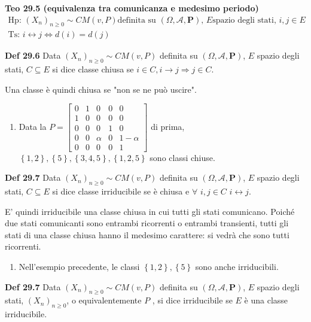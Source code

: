 \documentclass{article}
\begin{document}
\textbf{Teo 29.5 (equivalenza tra comunicanza e medesimo periodo)}%
\begin{gather*}
\text{Hp: }\left( X_{n}\right) _{n\geq 0}\sim CM\left( v,P\right) \text{
definita su }\left( \Omega ,\mathcal{A},\mathbf{P}\right) \text{, }E\text{
spazio degli stati, }i,j\in E \\
\text{Ts: }i\leftrightarrow j\Longleftrightarrow d\left( i\right) =d\left(
j\right)
\end{gather*}

\textbf{Def 29.6} Data $\left( X_{n}\right) _{n\geq 0}\sim CM\left(
v,P\right) $ definita su $\left( \Omega ,\mathcal{A},\mathbf{P}\right) $, $E$
spazio degli stati, $C\subseteq E$ si dice classe chiusa se $i\in
C,i\rightarrow j\Longrightarrow j\in C$.

Una classe \`{e} quindi chiusa se "non se ne pu\`{o} uscire".

\begin{enumerate}
\item Data la $P=\left[ 
\begin{array}{ccccc}
0 & 1 & 0 & 0 & 0 \\ 
1 & 0 & 0 & 0 & 0 \\ 
0 & 0 & 0 & 1 & 0 \\ 
0 & 0 & \alpha & 0 & 1-\alpha \\ 
0 & 0 & 0 & 0 & 1%
\end{array}%
\right] $ di prima, $\left\{ 1,2\right\} ,\left\{ 5\right\} ,\left\{
3,4,5\right\} ,\left\{ 1,2,5\right\} $ sono classi chiuse.
\end{enumerate}

\textbf{Def 29.7} Data $\left( X_{n}\right) _{n\geq 0}\sim CM\left(
v,P\right) $ definita su $\left( \Omega ,\mathcal{A},\mathbf{P}\right) $, $E$
spazio degli stati, $C\subseteq E$ si dice classe irriducibile se \`{e}
chiusa e $\forall $ $i,j\in C$ $i\leftrightarrow j$.

E' quindi irriducibile una classe chiusa in cui tutti gli stati comunicano.
Poich\'{e} due stati comunicanti sono entrambi ricorrenti o entrambi
transienti, tutti gli stati di una classe chiusa hanno il medesimo
carattere: si vedr\`{a} che sono tutti ricorrenti.

\begin{enumerate}
\item Nell'esempio precedente, le classi $\left\{ 1,2\right\} ,\left\{
5\right\} $ sono anche irriducibili.
\end{enumerate}

\textbf{Def 29.7} Data $\left( X_{n}\right) _{n\geq 0}\sim CM\left(
v,P\right) $ definita su $\left( \Omega ,\mathcal{A},\mathbf{P}\right) $, $E$
spazio degli stati, $\left( X_{n}\right) _{n\geq 0}$, o equivalentemente $P$%
, si dice irriducibile se $E$ \`{e} una classe irriducibile.
\end{document}
